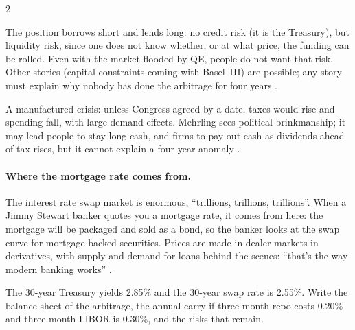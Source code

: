 \begin{paracol}{2}
\begin{nfigure}
\begin{taccts}
\end{taccts}
\caption{The arbitrage that would close a negative swap spread: no credit risk, but borrowing short to lend long .}\label{fig:irs-arb}
\end{nfigure}

\begin{intuition}
The position borrows short and lends long: no credit risk (it is the Treasury), but liquidity risk, since one does not know whether, or at what price, the funding
can be rolled. Even with the market flooded by QE, people do not want that risk. Other stories (capital constraints coming with Basel~III) are possible; any story
must explain why nobody has done the arbitrage for four years .
\end{intuition}

\begin{aside}
A manufactured crisis: unless Congress agreed by a date, taxes would rise and spending fall, with large demand effects. Mehrling sees political brinkmanship; it may
lead people to stay long cash, and firms to pay out cash as dividends ahead of tax rises, but it cannot explain a four-year anomaly
.
\end{aside}

\paragraph{Where the mortgage rate comes from.} The interest rate swap market is enormous, ``trillions, trillions, trillions''. When a Jimmy Stewart banker quotes you
a mortgage rate, it comes from here: the mortgage will be packaged and sold as a bond, so the banker looks at the swap curve for mortgage-backed securities. Prices
are made in dealer markets in derivatives, with supply and demand for loans behind the scenes: ``that's the way modern banking works''
.

\flushside

\begin{exercise}
The 30-year Treasury yields 2.85\% and the 30-year swap rate is 2.55\%. Write the balance sheet of the arbitrage, the annual carry if three-month repo costs 0.20\%
and three-month LIBOR is 0.30\%, and the risks that remain.
\end{exercise}

\end{paracol}
